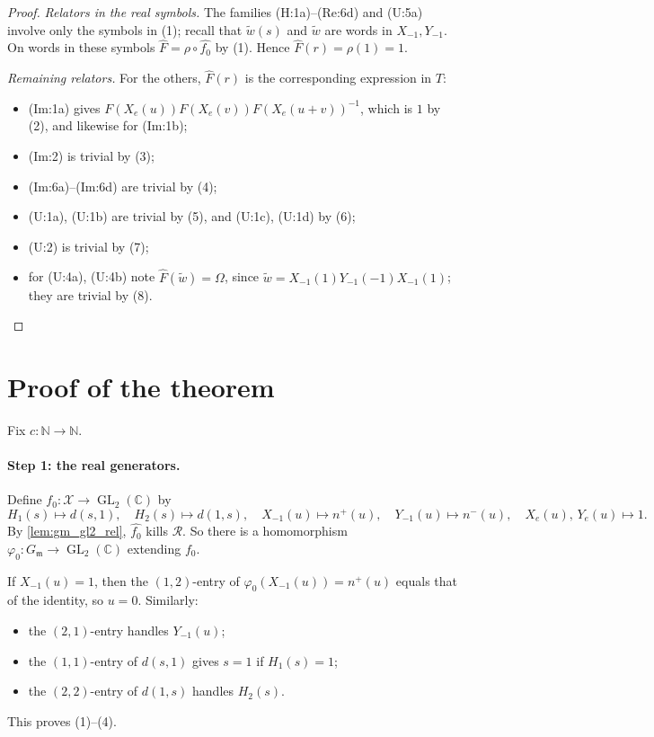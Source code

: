 \documentclass[11pt]{article}
\theoremstyle{definition}
\theoremstyle{remark}
\newcommand{\CC}{\mathbb{C}}
\newcommand{\NN}{\mathbb{N}}
\newcommand{\wt}{\widetilde{w}}
\DeclareMathOperator{\GL}{GL}
\begin{document}
\begin{proof}
\emph{Relators in the real symbols.} The families (H:1a)--(Re:6d) and (U:5a) involve only the symbols in (1); recall that $\wt(s)$ and $\wt$ are words in $X_{-1},Y_{-1}$. On words in these symbols $\widehat F=\rho\circ\widehat{f_0}$ by (1). Hence $\widehat F(r)=\rho(1)=1$.

\emph{Remaining relators.} For the others, $\widehat F(r)$ is the corresponding expression in $T$:
\begin{itemize}
\item (Im:1a) gives $F(X_e(u))F(X_e(v))F(X_e(u+v))^{-1}$, which is $1$ by (2), and likewise for (Im:1b);
\item (Im:2) is trivial by (3);
\item (Im:6a)--(Im:6d) are trivial by (4);
\item (U:1a), (U:1b) are trivial by (5), and (U:1c), (U:1d) by (6);
\item (U:2) is trivial by (7);
\item for (U:4a), (U:4b) note $\widehat F(\wt)=\Omega$, since $\wt=X_{-1}(1)Y_{-1}(-1)X_{-1}(1)$; they are trivial by (8).
\end{itemize}
\end{proof}

\section{Proof of the theorem}

Fix $c\colon\NN\to\NN$.

\paragraph{Step 1: the real generators.}
Define $f_0\colon\mathcal X\to\GL_2(\CC)$ by
\[
H_1(s)\mapsto d(s,1),\quad H_2(s)\mapsto d(1,s),\quad X_{-1}(u)\mapsto n^+(u),\quad Y_{-1}(u)\mapsto n^-(u),\quad X_e(u),\,Y_e(u)\mapsto1 .
\]
By \cref{lem:gm_gl2_rel}, $\widehat{f_0}$ kills $\mathcal R$. So there is a homomorphism $\varphi_0\colon G_{\mathfrak m}\to\GL_2(\CC)$ extending $f_0$.

If $X_{-1}(u)=1$, then the $(1,2)$-entry of $\varphi_0(X_{-1}(u))=n^+(u)$ equals that of the identity, so $u=0$. Similarly:
\begin{itemize}
\item the $(2,1)$-entry handles $Y_{-1}(u)$;
\item the $(1,1)$-entry of $d(s,1)$ gives $s=1$ if $H_1(s)=1$;
\item the $(2,2)$-entry of $d(1,s)$ handles $H_2(s)$.
\end{itemize}
This proves (1)--(4).
\end{document}
